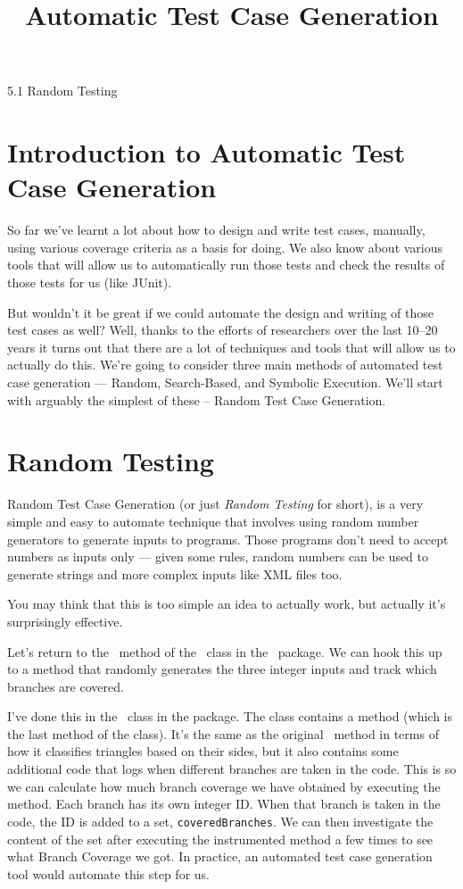 



\title{Automatic Test Case Generation}{5.1 Random Testing}

\section{Introduction to Automatic Test Case Generation}

So far we've learnt a lot about how to design and write test cases, manually, using
various coverage criteria as a basis for doing. We also know about various tools
that will allow us to automatically run those tests and check the results of
those tests for us (like JUnit). 

But wouldn't it be great if we could automate the design and writing of those
test cases as well? Well, thanks to the efforts of researchers over the last
10--20 years it turns out that there are a lot of techniques and tools that will
allow us to actually do this. We're going to consider three main methods of
automated test case generation --- Random, Search-Based, and Symbolic Execution.
We'll start with arguably the simplest of these -- Random Test Case Generation.


\section{Random Testing}

Random Test Case Generation (or just {\it Random Testing} for short), is a very
simple and easy to automate technique that involves using random number
generators to generate inputs to programs. Those programs don't need to accept
numbers as inputs only --- given some rules, random numbers can be used to
generate strings and more complex inputs like XML files too.

You may think that this is too simple an idea to actually work, but actually
it's surprisingly effective. 


Let's return to the \classifymethod~method of the \triangleclass~class in the
\lecturespackage~package. We can hook this up to a method that randomly
generates the three integer inputs and track which branches are covered. 

I've done this in the \randomlytesttriangleclass~class in the
\lecturesexecutionpackage package. The class contains a method
\instrumentedclassifymethod (which is the last method of the class). It's the
same as the original \classifymethod~method in terms of how it classifies
triangles based on their sides, but it also contains some additional code that
logs when different branches are taken in the code. This is so we can calculate
how much branch coverage we have obtained by executing the method. Each branch
has its own integer ID. When that branch is taken in the code, the ID is added
to a set, {\tt coveredBranches}. We can then investigate the content of the set
after executing the instrumented method a few times to see what Branch Coverage
we got. In practice, an automated test case generation tool would automate this
step for us.

